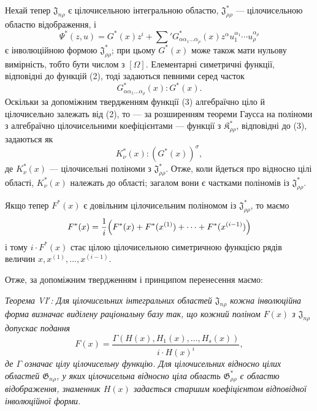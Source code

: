 \documentclass[11pt]{article}
\providecommand{\Kfield}{\mathfrak{K}}
\providecommand{\Jdom}{\mathfrak{J}}
\providecommand{\Gdom}{\mathfrak{G}}
\begin{document}
Нехай тепер $\Jdom_{n\rho}$ є цілочисельною інтегральною областю, $\Jdom^*_{\rho\rho}$ --- цілочисельною областю відображення, і
\[
  \Psi^*(z,u)=G^*(x)z^i+
  \sum{}'G^*_{\alpha\alpha_1\ldots\alpha_\rho}(x)
  z^\alpha u_1^{\alpha_1}\cdots u_\rho^{\alpha_\rho}
\]
є інволюційною формою $\Jdom^*_{\rho\rho}$; при цьому $G^*(x)$ може також мати нульову вимірність, тобто бути числом з $[\Omega]$. Елементарні симетричні функції, відповідні до функцій (2), тоді задаються певними серед часток
\begin{equation}
  G^*_{\alpha\alpha_1\ldots\alpha_\rho}(x):G^*(x).
\tag{4}
\end{equation}
Оскільки за допоміжним твердженням функції (3) алгебраїчно ціло й цілочисельно залежать від (2), то --- за розширенням теореми Гаусса на поліноми з алгебраїчно цілочисельними коефіцієнтами --- функції з $\Kfield^*_{\rho\rho}$, відповідні до (3), задаються як
\begin{equation}
  K_\nu^*(x):(G^*(x))^\sigma,
\tag{5}
\end{equation}
де $K_\nu^*(x)$ --- цілочисельні поліноми з $\Jdom^*_{\rho\rho}$. Отже, коли йдеться про відносно цілі області, $K_\nu^*(x)$ належать до області; загалом вони є частками поліномів із $\Jdom^*_{\rho\rho}$.

Якщо тепер $F^*(x)$ є довільним цілочисельним поліномом із $\Jdom^*_{\rho\rho}$, то маємо
\[
  F^*(x)=\frac1i\Bigl(F^*(x)+F^*(x^{(1)})+\cdots+F^*(x^{(i-1)})\Bigr)
\]
і тому $i\cdot F^*(x)$ стає цілою цілочисельною симетричною функцією рядів величин $x,x^{(1)},\ldots,x^{(i-1)}$.

Отже, за допоміжним твердженням і принципом перенесення маємо:

\emph{Теорема VI$'$: Для цілочисельних інтегральних областей $\Jdom_{n\rho}$ кожна інволюційна форма визначає виділену раціональну базу так, що кожний поліном $F(x)$ з $\Jdom_{n\rho}$ допускає подання}
\[
  F(x)=\frac{\Gamma(H(x),H_1(x),\ldots,H_s(x))}{i\cdot H(x)^i},
\]
\emph{де $\Gamma$ означає цілу цілочисельну функцію. Для цілочисельних відносно цілих областей $\Gdom_{n\rho}$, у яких цілочисельна відносно ціла область $\Gdom^*_{\rho\rho}$ є областю відображення, знаменник $H(x)$ задається старшим коефіцієнтом відповідної інволюційної форми.}
\end{document}
